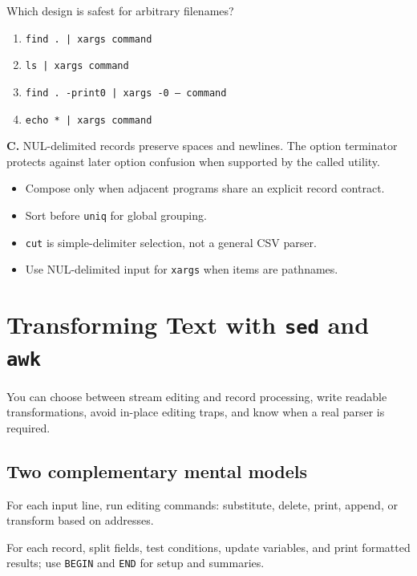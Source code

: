 \documentclass[11pt,oneside,openany]{book}
\newcommand{\fourchoices}[4]{%
  \begin{enumerate}[label=\Alph*),leftmargin=2em,itemsep=0.25em]
    \item #1
    \item #2
    \item #3
    \item #4
  \end{enumerate}}
\newcommand{\chaptergoals}[1]{%
  \begin{tcolorbox}[colback=Paper,colframe=Blue,title={Learning outcomes},fonttitle=\bfseries]
  #1
  \end{tcolorbox}}
\begin{document}
\begin{questionbox}[title={Hard 11.2 -- \texttt{xargs}}]
Which design is safest for arbitrary filenames?
\fourchoices{\texttt{find . | xargs command}}{\texttt{ls | xargs command}}{\texttt{find . -print0 | xargs -0 -- command}}{\texttt{echo * | xargs command}}
\end{questionbox}
\begin{answerbox}
\textbf{C.} NUL-delimited records preserve spaces and newlines. The option terminator protects against later option confusion when supported by the called utility.
\end{answerbox}

\begin{recapbox}
\begin{itemize}
  \item Compose only when adjacent programs share an explicit record contract.
  \item Sort before \texttt{uniq} for global grouping.
  \item \texttt{cut} is simple-delimiter selection, not a general CSV parser.
  \item Use NUL-delimited input for \texttt{xargs} when items are pathnames.
\end{itemize}
\end{recapbox}

\chapter{Transforming Text with \texttt{sed} and \texttt{awk}}
\chaptergoals{You can choose between stream editing and record processing, write readable transformations, avoid in-place editing traps, and know when a real parser is required.}

\section{Two complementary mental models}
\begin{description}[style=nextline,leftmargin=2em]
  \item[\texttt{sed}: select and edit a stream] For each input line, run editing commands: substitute, delete, print, append, or transform based on addresses.
  \item[\texttt{awk}: pattern plus action over records and fields] For each record, split fields, test conditions, update variables, and print formatted results; use \texttt{BEGIN} and \texttt{END} for setup and summaries.
\end{description}
\end{document}
